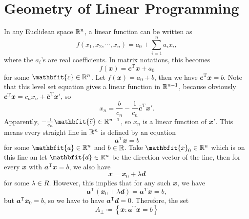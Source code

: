 \documentclass[math, code]{amznotes}
\theoremstyle{remark}
\begin{document}
\section{Geometry of Linear Programming}
In any Euclidean space $\mathbb{R}^n$, a linear function can be written as 
\begin{equation*}
    f(x_1, x_2, \cdots, x_n) = a_0 + \sum_{i = 1}^{n}a_ix_i,
\end{equation*}
where the $a_i$'s are real coefficients. In matrix notations, this becomes
\begin{equation*}
    f(\mathbfit{x}) = \mathbfit{c}^{\mathrm{T}}\mathbfit{x} + a_0
\end{equation*}
for some $\mathbfit{c} \in \R^n$. Let $f(\mathbfit{x}) = a_0 + b$, then we have $\mathbfit{c}^{\mathrm{T}}\mathbfit{x} = b$. Note that this level set equation gives a linear function in $\mathbb{R}^{n - 1}$, because obviously $\mathbfit{c}^{\mathrm{T}}\mathbfit{x} = c_nx_n + \mathbfit{\bar{c}}^{\mathrm{T}}\mathbfit{x'}$, so
\begin{equation*}
    x_n = \frac{b}{c_n} - \frac{1}{c_n}\mathbfit{\bar{c}}^{\mathrm{T}}\mathbfit{x'}.
\end{equation*} 
Apparently, $-\frac{1}{c_n}\mathbfit{\bar{c}} \in \R^{n - 1}$, so $x_n$ is a linear function of $\mathbfit{x}'$. This means every straight line in $\mathbb{R}^n$ is defined by an equation
\begin{equation*}
    \mathbfit{a}^{\mathrm{T}}\mathbfit{x} = b
\end{equation*}
for some $\mathbfit{a} \in \R^n$ and $b \in \mathbb{R}$. Take $\mathbfit{x}_0 \in \R^n$ which is on this line an let $\mathbfit{d} \in \R^n$ be the direction vector of the line, then for every $\mathbfit{x}$ with $\mathbfit{a}^{\mathrm{T}}\mathbfit{x} = b$, we also have 
\begin{equation*}
    \mathbfit{x} = \mathbfit{x}_0 + \lambda\mathbfit{d}
\end{equation*}
for some $\lambda \in R$. However, this implies that for any such $\mathbfit{x}$, we have
\begin{equation*}
    \mathbfit{a}^{\mathrm{T}}(\mathbfit{x}_0 + \lambda\mathbfit{d}) = \mathbfit{a}^{\mathrm{T}}\mathbfit{x} = b,
\end{equation*}
but $\mathbfit{a}^{\mathrm{T}}\mathbfit{x}_0 = b$, so we have to have $\mathbfit{a}^{\mathrm{T}}\mathbfit{d} = 0$. Therefore, the set
\begin{equation*}
    A_{\perp} \coloneqq \left\{\mathbfit{x} \colon \mathbfit{a}^{\mathrm{T}}\mathbfit{x} = b\right\}
\end{equation*}
\end{document}
